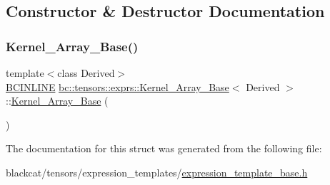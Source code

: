 \subsection{Constructor \& Destructor Documentation}
\mbox{\label{structbc_1_1tensors_1_1exprs_1_1Kernel__Array__Base_a2f8191bf06d41edf9181dc6e0692e3ce}} 
\subsubsection{\texorpdfstring{Kernel\+\_\+\+Array\+\_\+\+Base()}{Kernel\_Array\_Base()}}
{\footnotesize\ttfamily template$<$class Derived$>$ \\
\hyperlink{common_8h_a6699e8b0449da5c0fafb878e59c1d4b1}{B\+C\+I\+N\+L\+I\+NE} \hyperlink{structbc_1_1tensors_1_1exprs_1_1Kernel__Array__Base}{bc\+::tensors\+::exprs\+::\+Kernel\+\_\+\+Array\+\_\+\+Base}$<$ Derived $>$\+::\hyperlink{structbc_1_1tensors_1_1exprs_1_1Kernel__Array__Base}{Kernel\+\_\+\+Array\+\_\+\+Base} (\begin{DoxyParamCaption}{ }\end{DoxyParamCaption})\hspace{0.3cm}{\ttfamily [inline]}}



The documentation for this struct was generated from the following file\+:\begin{DoxyCompactItemize}
\item 
blackcat/tensors/expression\+\_\+templates/\hyperlink{expression__template__base_8h}{expression\+\_\+template\+\_\+base.\+h}\end{DoxyCompactItemize}
